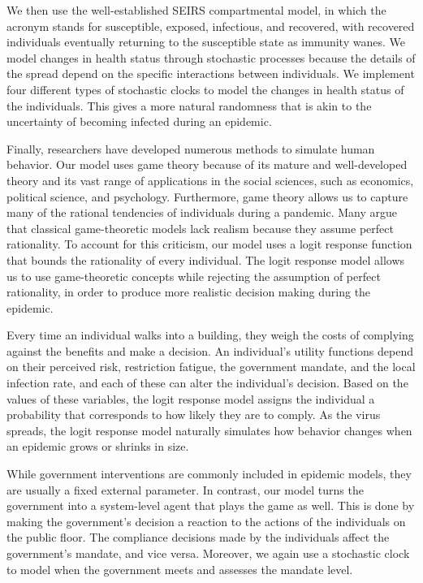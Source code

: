 \documentclass[11pt]{article}
\theoremstyle{definition}
\theoremstyle{plain}
\begin{document}
We then use the well-established SEIRS compartmental model, in which the acronym stands for susceptible, exposed, infectious, and recovered, with recovered individuals eventually returning to the susceptible state as immunity wanes. We model changes in health status through stochastic processes because the details of the spread depend on the specific interactions between individuals. We implement four different types of stochastic clocks to model the changes in health status of the individuals. This gives a more natural randomness that is akin to the uncertainty of becoming infected during an epidemic.

Finally, researchers have developed numerous methods to simulate human behavior. Our model uses game theory because of its mature and well-developed theory and its vast range of applications in the social sciences, such as economics, political science, and psychology. Furthermore, game theory allows us to capture many of the rational tendencies of individuals during a pandemic. Many argue that classical game-theoretic models lack realism because they assume perfect rationality. To account for this criticism, our model uses a logit response function that bounds the rationality of every individual. The logit response model allows us to use game-theoretic concepts while rejecting the assumption of perfect rationality, in order to produce more realistic decision making during the epidemic.

Every time an individual walks into a building, they weigh the costs of complying against the benefits and make a decision. An individual's utility functions depend on their perceived risk, restriction fatigue, the government mandate, and the local infection rate, and each of these can alter the individual's decision. Based on the values of these variables, the logit response model assigns the individual a probability that corresponds to how likely they are to comply. As the virus spreads, the logit response model naturally simulates how behavior changes when an epidemic grows or shrinks in size.

While government interventions are commonly included in epidemic models, they are usually a fixed external parameter. In contrast, our model turns the government into a system-level agent that plays the game as well. This is done by making the government's decision a reaction to the actions of the individuals on the public floor. The compliance decisions made by the individuals affect the government's mandate, and vice versa. Moreover, we again use a stochastic clock to model when the government meets and assesses the mandate level.
\end{document}
